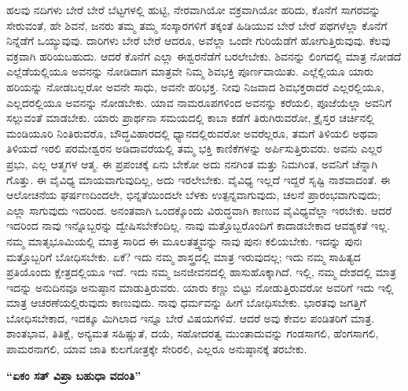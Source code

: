 ಹಲವು ನದಿಗಳು ಬೇರೆ ಬೇರೆ ಬೆಟ್ಟಗಳಲ್ಲಿ ಹುಟ್ಟಿ, ನೇರವಾಗಿಯೋ ವಕ್ರವಾಗಿಯೋ ಹರಿದು, ಕೊನೆಗೆ ಸಾಗರವನ್ನು ಸೇರುವಂತೆ, ಹೇ ಶಿವನೆ, ಜನರು ತಮ್ಮ ತಮ್ಮ ಸಂಸ್ಕಾರಗಳಿಗೆ ತಕ್ಕಂತೆ ಹಿಡಿಯುವ ಬೇರೆ ಬೇರೆ ಪಥಗಳೆಲ್ಲಾ ಕೊನೆಗೆ ನಿನ್ನೆಡೆಗೆ ಒಯ್ಯುವುವು. ದಾರಿಗಳು ಬೇರೆ ಬೇರೆ ಆದರೂ, ಅವೆಲ್ಲಾ ಒಂದೇ ಗುರಿಯೆಡೆಗೆ ಹೋಗುತ್ತಿರುವುವು. ಕೆಲವು ವಕ್ರವಾಗಿ ಹರಿಯಬಹುದು. ಆದರೆ ಕೊನೆಗೆ ಎಲ್ಲಾ ಈಶ್ವರನೆಡೆಗೆ ಬರಲೇಬೇಕು. ಶಿವನನ್ನು ಲಿಂಗದಲ್ಲಿ ಮಾತ್ರ ನೋಡದೆ ಎಲ್ಲೆಡೆಯಲ್ಲಿಯೂ ಅವನನ್ನು ನೋಡಿದಾಗ ಮಾತ್ರವೇ ನಿಮ್ಮ ಶಿವಭಕ್ತಿ ಪೂರ್ಣವಾಯಿತು. ಎಲ್ಲೆಲ್ಲಿಯೂ ಯಾರು ಹರಿಯನ್ನು ನೋಡಬಲ್ಲರೋ ಅವನೇ ಸಾಧು, ಅವನೇ ಹರಿಭಕ್ತ. ನೀವು ನಿಜವಾದ ಶಿವಭಕ್ತರಾದರೆ ಎಲ್ಲರಲ್ಲಿಯೂ, ಎಲ್ಲದರಲ್ಲಿಯೂ ಅವನನ್ನು ನೋಡಬೇಕು. ಯಾವ ನಾಮರೂಪಗಳಿಂದ ಅವನನ್ನು ಕರೆಯಲಿ, ಪೂಜೆಯೆಲ್ಲಾ ಅವನಿಗೆ ಸಲ್ಲುವಂತೆ ಮಾಡಬೇಕು. ಯಾರು ಪ್ರಾರ್ಥನಾ ಸಮಯದಲ್ಲಿ ಕಾಬಾ ಕಡೆಗೆ ತಿರುಗಿರುವರೋ, ಕ್ರೈಸ್ತರ ಚರ್ಚಿನಲ್ಲಿ ಮಂಡಿಯೂರಿ ನಿಂತಿರುವರೊ, ಬೌದ್ಧವಿಹಾರದಲ್ಲಿ ಧ್ಯಾನದಲ್ಲಿರುವರೋ ಅವರೆಲ್ಲರೂ, ತಮಗೆ ತಿಳಿಯಲಿ ಅಥವಾ ತಿಳಿಯದೆ ಇರಲಿ ಪರಮೇಶ್ವರನ ಅಡಿದಾವರೆಯಲ್ಲಿ ತಮ್ಮ ಭಕ್ತಿ ಕಾಣಿಕೆಗಳನ್ನು ಅರ್ಪಿಸುತ್ತಿರುವರು. ಅವನು ಎಲ್ಲರ ಪ್ರಭು, ಎಲ್ಲ ಆತ್ಮಗಳ ಆತ್ಮ. ಈ ಪ್ರಪಂಚಕ್ಕೆ ಏನು ಬೇಕೋ ಅದು ನನಗಿಂತ ಮತ್ತು ನಿಮಗಿಂತ, ಅವನಿಗೆ ಚೆನ್ನಾಗಿ ಗೊತ್ತು. ಈ ವೈವಿಧ್ಯ ಮಾಯವಾಗುವುದಿಲ್ಲ, ಅದು ಇರಲೇಬೇಕು. ವೈವಿಧ್ಯ ಇಲ್ಲದೆ ಇದ್ದರೆ ಸೃಷ್ಟಿ ನಾಶವಾದಂತೆ. ಈ ಆಲೋಚನೆಯ ಘರ್ಷಣದಿಂದಲೇ, ಭಿನ್ನತೆಯಿಂದಲೇ ಬೆಳಕು ಉತ್ಪನ್ನವಾಗುವುದು, ಚಲನೆ ಪ್ರಾರಂಭವಾಗುವುದು; ಎಲ್ಲಾ ಸಾಗುವುದು ಇದರಿಂದ. ಅನಂತವಾಗಿ ಒಂದಕ್ಕೊಂದು ವಿರುದ್ಧವಾಗಿ ಕಾಣುವ ವೈವಿಧ್ಯವೆಲ್ಲಾ ಇರಬೇಕು. ಆದರೆ ಇದರಿಂದ ನಾವು ಇನ್ನೊಬ್ಬರನ್ನು ದ್ವೇಷಿಸಬೇಕೆಂದಿಲ್ಲ. ನಾವು ಮತ್ತೊಬ್ಬರೊಂದಿಗೆ ಕಾದಾಡಬೇಕಾದ ಆವಶ್ಯಕತೆ ಇಲ್ಲ. ನಮ್ಮ ಮಾತೃಭೂಮಿಯಲ್ಲಿ ಮಾತ್ರ ಸಾರಿದ ಈ ಮೂಲತತ್ತ್ವವನ್ನು ನಾವು ಪುನಃ ಕಲಿಯಬೇಕು. ಇದನ್ನು ಪುನಃ ಮತ್ತೊಬ್ಬರಿಗೆ ಬೋಧಿಸಬೇಕು. ಏಕೆ? ಇದು ನಮ್ಮ ಶಾಸ್ತ್ರದಲ್ಲಿ ಮಾತ್ರ ಇರುವುದಲ್ಲ; ಇದು ನಮ್ಮ ಸಾಹಿತ್ಯದ ಪ್ರತಿಯೊಂದು ಕ್ಷೇತ್ರದಲ್ಲಿಯೂ ಇದೆ. ಇದು ನಮ್ಮ ಜನಜೀವನದಲ್ಲಿ ಹಾಸುಹೊಕ್ಕಾಗಿದೆ. ಇಲ್ಲಿ, ನಮ್ಮ ದೇಶದಲ್ಲಿ ಮಾತ್ರ ಇದನ್ನು ಅನುದಿನವೂ ಅನುಷ್ಠಾನ ಮಾಡುತ್ತಿರುವರು. ಯಾರು ಕಣ್ಣು ಬಿಟ್ಟು ನೋಡುತ್ತಿರುವರೋ ಅವರಿಗೆ ಇದು ಇಲ್ಲಿ ಮಾತ್ರ ಆಚರಣೆಯಲ್ಲಿರುವುದು ಕಾಣುವುದು. ನಾವು ಧರ್ಮವನ್ನು ಹೀಗೆ ಬೋಧಿಸಬೇಕು. ಭಾರತವು ಜಗತ್ತಿಗೆ ಬೋಧಿಸಬೇಕಾದ, ಇದಕ್ಕೂ ಮಿಗಿಲಾದ ಇನ್ನೂ ಬೇರೆ ವಿಷಯಗಳಿವೆ. ಆದರೆ ಅವು ಕೇವಲ ಪಂಡಿತರಿಗೆ ಮಾತ್ರ. ಶಾಂತಭಾವ, ತಿತಿಕ್ಷೆ, ಅನ್ಯಮತ ಸಹಿಷ್ಣುತೆ, ದಯೆ, ಸಹೋದರತ್ವ ಮುಂತಾದುವನ್ನು ಗಂಡಸಾಗಲಿ, ಹೆಂಗಸಾಗಲಿ, ಪಾಮರನಾಗಲಿ, ಯಾವ ಜಾತಿ ಕುಲಗೋತ್ರಕ್ಕೇ ಸೇರಿರಲಿ, ಎಲ್ಲರೂ ಅನುಷ್ಠಾನಕ್ಕೆ ತರಬೇಕು.

\begin{center}
\textbf{“ಏಕಂ ಸತ್ ವಿಪ್ರಾ ಬಹುಧಾ ವದಂತಿ”}
\end{center}

